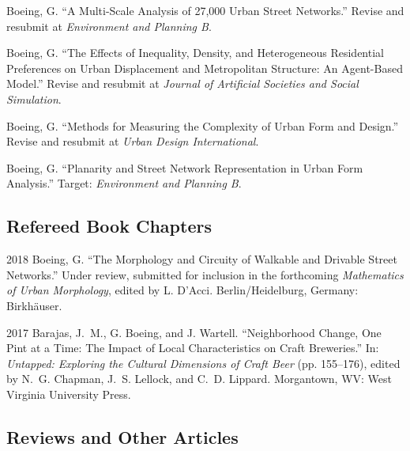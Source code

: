 \documentclass{academiccv}
\begin{document}
\begin{tablist}
	
\item[\the\year] \tab Boeing, G. \enquote{A Multi-Scale Analysis of 27,000 Urban Street Networks.} Revise and resubmit at \textit{Environment and Planning B}.

\item[\the\year] \tab Boeing, G. \enquote{The Effects of Inequality, Density, and Heterogeneous Residential Preferences on Urban Displacement and Metropolitan Structure: An Agent-Based Model.} Revise and resubmit at \textit{Journal of Artificial Societies and Social Simulation}.

\item[\the\year] \tab Boeing, G. \enquote{Methods for Measuring the Complexity of Urban Form and Design.} Revise and resubmit at \textit{Urban Design International}.

\item[\the\year] \tab Boeing, G. \enquote{Planarity and Street Network Representation in Urban Form Analysis.} Target: \textit{Environment and Planning B}.

\end{tablist}



\subsection*{Refereed Book Chapters}

\begin{tablist}

\item[2018] \tab Boeing, G. \enquote{The Morphology and Circuity of Walkable and Drivable Street Networks.} Under review, submitted for inclusion in the forthcoming \textit{Mathematics of Urban Morphology}, edited by L. D'Acci. Berlin/Heidelburg, Germany: Birkh{\"a}user.

\item[2017] \tab Barajas, J.~M., G. Boeing, and J. Wartell. \enquote{Neighborhood Change, One Pint at a Time: The Impact of Local Characteristics on Craft Breweries.} In: \textit{Untapped: Exploring the Cultural Dimensions of Craft Beer} (pp. 155--176), edited by N.~G. Chapman, J.~S. Lellock, and C.~D. Lippard. Morgantown, WV: West Virginia University Press.

\end{tablist}



\subsection*{Reviews and Other Articles}
\end{document}
